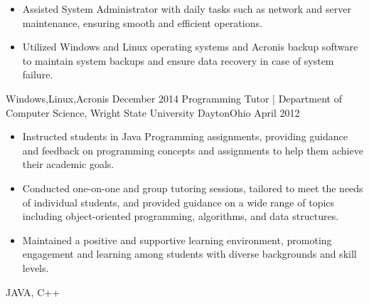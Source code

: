 \begin{experiences}
{\begin{itemize}
          \item Assisted System Administrator with daily tasks such as network and server maintenance, ensuring smooth and efficient operations.
          \item Utilized Windows and Linux operating systems and Acronis backup software to maintain system backups and ensure data recovery in case of system failure.
      \end{itemize}
  }
  {Windows,Linux,Acronis}
  \emptySeparator
  \experience
    {December 2014}     { Programming Tutor | Department of Computer Science, Wright State University }{Dayton}{Ohio}
    {April 2012}    {
      \begin{itemize}
        \item Instructed students in Java Programming assignments, providing guidance and feedback on programming concepts and assignments to help them achieve their academic goals.
        \item Conducted one-on-one and group tutoring sessions, tailored to meet the needs of individual students, and provided guidance on a wide range of topics including object-oriented programming, algorithms, and data structures.
        \item Maintained a positive and supportive learning environment, promoting engagement and learning among students with diverse backgrounds and skill levels.
      \end{itemize}
    }
    {JAVA, C++}
  \emptySeparator

\end{experiences}
